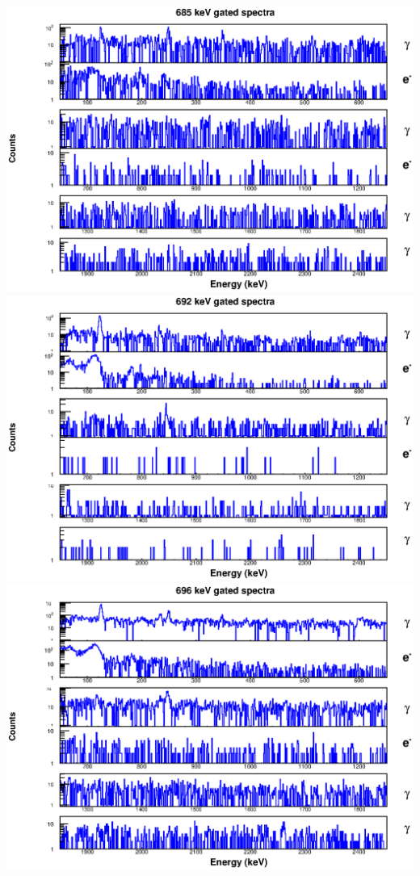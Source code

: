 \includegraphics[scale=0.8]{154Gd_Appendix/685_combined.eps}
\includegraphics[scale=0.8]{154Gd_Appendix/692_combined.eps}
\includegraphics[scale=0.8]{154Gd_Appendix/696_combined.eps}
